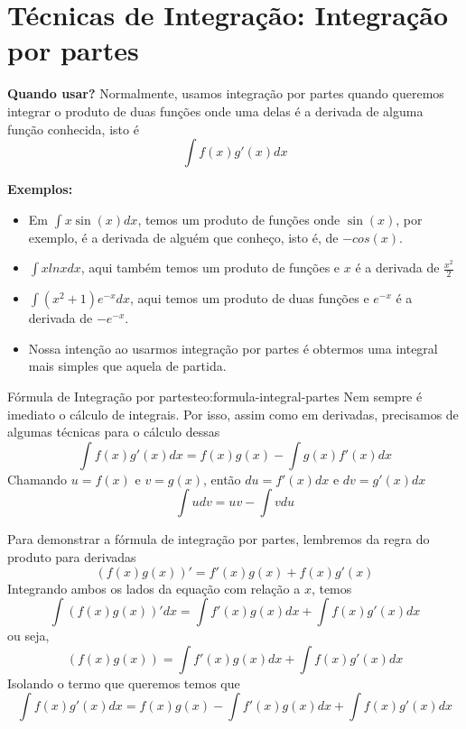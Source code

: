 \section{Técnicas de Integração: Integração por partes}

\textbf{Quando usar?} Normalmente, usamos integração por partes quando queremos
integrar o produto de duas funções onde uma delas é a derivada de alguma função
conhecida, isto é
\[
  \int f(x) g'(x) dx
\]

\textbf{Exemplos:}
\begin{itemize}
  \item Em $\int x \sin(x) dx$, temos um produto de funções onde $\sin(x)$, por
      exemplo, é a derivada de alguém que conheço, isto é, de $-cos(x)$.

  \item $\int x lnx dx$, aqui também temos um produto de funções e $x$ é a
      derivada de $\frac{x^2}{2}$

  \item $\int (x^2+1) e^{-x} dx$, aqui temos um produto de duas funções e
      $e^{-x}$ é a derivada de $-e^{-x}$.

  \item Nossa intenção ao usarmos integração por partes é obtermos uma integral
  mais simples que aquela de partida.
\end{itemize}

\begin{teorema}{Fórmula de Integração por partes}{teo:formula-integral-partes}
  Nem sempre é imediato o cálculo de integrais.
  Por isso, assim como em derivadas,
  precisamos de algumas técnicas para o cálculo dessas
  \begin{equation}
    \label{eq:formula_partes-1}
    \int f(x) g'(x) dx= f(x) g(x)- \int g(x) f'(x)dx
  \end{equation}
  Chamando $u=f(x)$ e $v=g(x)$, então $du=f'(x)dx$ e $dv=g'(x)dx$
  \begin{equation}
    \label{eq:formula_partes-2}
    \int u dv=uv- \int v du
  \end{equation}
\end{teorema}

Para demonstrar a fórmula de integração por partes,
lembremos da regra do produto para derivadas
\[
  (f(x)g(x))'= f'(x)g(x)+f(x)g'(x)
\]
Integrando ambos os lados da equação com relação a $x$, temos
\[
  \int (f(x)g(x))' dx= \int f'(x)g(x) dx+ \int f(x)g'(x) dx
\]
ou seja,
\[
  (f(x)g(x)) = \int f'(x)g(x) dx+ \int f(x)g'(x) dx
\]
Isolando o termo que queremos temos que
\[
  \int f(x)g'(x) dx= f(x)g(x)-\int f'(x)g(x) dx+ \int f(x)g'(x) dx
\]

